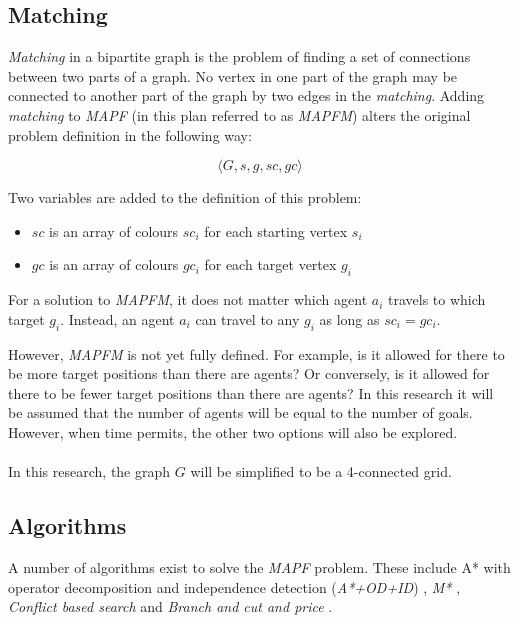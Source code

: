 \documentclass[english]{article}
\begin{document}
\subsection{Matching}
\textit{Matching} in a bipartite graph is the problem of finding a set of connections between two parts of a graph. No vertex in one part of the graph may be connected to another part of the graph by two edges in the \textit{matching}. Adding \textit{matching} to \textit{MAPF} (in this plan referred to as \textit{MAPFM}) alters the original problem definition in the following way:

$$
\langle G, s, g, sc, gc \rangle
$$

Two variables are added to the definition of this problem:

\begin{itemize}
    \item $sc$ is an array of colours $sc_i$ for each starting vertex $s_i$
    \item $gc$ is an array of colours $gc_i$ for each target vertex $g_i$
\end{itemize}

For a solution to \textit{MAPFM}, it does not matter which agent $a_i$ travels to which target $g_i$. Instead, an agent $a_i$ can travel to any $g_i$ as long as $sc_i = gc_i$.

However, \textit{MAPFM} is not yet fully defined. For example, is it allowed for there to be more target positions than there are agents? Or conversely, is it allowed for there to be fewer target positions than there are agents? In this research it will be assumed that the number of agents will be equal to the number of goals. However, when time permits, the other two options will also be explored.

\paragraph{}

In this research, the graph $G$ will be simplified to be a 4-connected grid.

\subsection{Algorithms}

A number of algorithms exist to solve the \textit{MAPF} problem. These include A* with operator decomposition and independence detection (\textit{A*+OD+ID}) \cite{AStarIDOD_standley_2010}, \textit{M*} \cite{mstar_wagner_2011}, \textit{Conflict based search} \cite{conflict_based_search_sharon_2015} and \textit{Branch and cut and price} \cite{bcp_lam_2019}.
\end{document}
